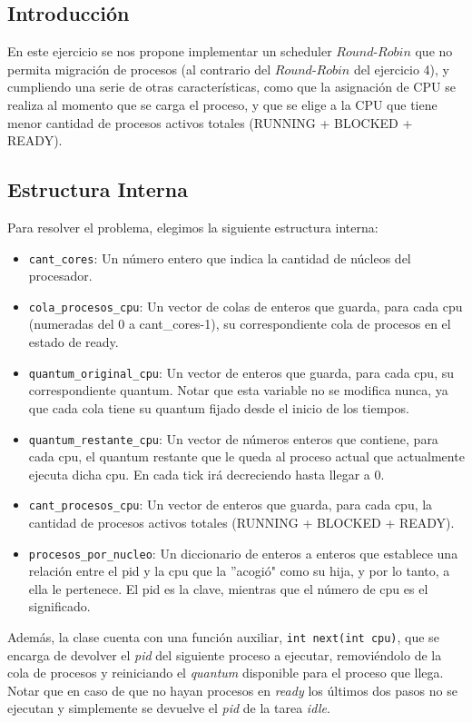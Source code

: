 \subsection{Introducci\'on} En este ejercicio se nos propone implementar un scheduler $Round$-$Robin$ que no permita migraci\'on de procesos (al contrario del $Round$-$Robin$ del ejercicio 4), y cumpliendo una serie de otras caracter\'isticas, como que la asignaci\'on de CPU se realiza al momento que se carga el proceso, y que se elige a la CPU que tiene menor cantidad de procesos activos totales (RUNNING + BLOCKED + READY).

\subsection{Estructura Interna} Para resolver el problema, elegimos la siguiente estructura interna:
\begin{itemize}
	\item \texttt{cant\_cores}: Un n\'umero entero que indica la cantidad de n\'ucleos del procesador.
	\item \texttt{cola\_procesos\_cpu}: Un vector de colas de enteros que guarda, para cada cpu (numeradas del 0 a cant\_cores-1), su correspondiente cola de procesos en el estado de ready.
	\item \texttt{quantum\_original\_cpu}: Un vector de enteros que guarda, para cada cpu, su correspondiente quantum. Notar que esta variable no se modifica nunca, ya que cada cola tiene su quantum fijado desde el inicio de los tiempos.
	\item \texttt{quantum\_restante\_cpu}: Un vector de n\'umeros enteros que contiene, para cada cpu, el quantum restante que le queda al proceso actual que actualmente ejecuta dicha cpu. En cada tick ir\'a decreciendo hasta llegar a 0.
	\item \texttt{cant\_procesos\_cpu}: Un vector de enteros que guarda, para cada cpu, la cantidad de procesos activos totales (RUNNING + BLOCKED + READY).
	\item \texttt{procesos\_por\_nucleo}: Un diccionario de enteros a enteros que establece una relaci\'on entre el pid y la cpu que la ''acogi\'o" como su hija, y por lo tanto, a ella le pertenece. El pid es la clave, mientras que el n\'umero de cpu es el significado.
\end{itemize}

Además, la clase cuenta con una función auxiliar, \texttt{int next(int cpu)}, que se encarga de devolver el \emph{pid} del siguiente proceso a ejecutar, removiéndolo de la cola de procesos y reiniciando el \emph{quantum} disponible para el proceso que llega. Notar que en caso de que no hayan procesos en \emph{ready} los últimos dos pasos no se ejecutan y simplemente se devuelve el \emph{pid} de la tarea \emph{idle}.

